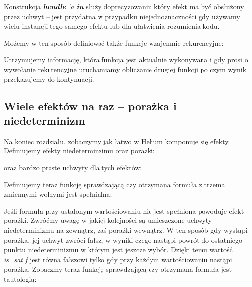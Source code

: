 Konstrukcja \textit{\textbf{handle} `a \textbf{in}} służy doprecyzowaniu który efekt ma być obsłużony przez uchwyt -- jest przydatna w przypadku niejednoznaczności gdy używamy wielu instancji tego samego efektu lub dla ułatwienia rozumienia kodu.

Możemy w ten sposób definiować także funkcje wzajemnie rekurencyjne:



Utrzymujemy informację, która funkcja jest aktualnie wykonywana i gdy prosi o wywołanie rekurencyjne uruchamiamy obliczanie drugiej funkcji po czym wynik przekazujemy do kontynuacji.

% 
% 

\subsection{Wiele efektów na raz -- porażka i niedeterminizm}

Na koniec rozdziału, zobaczymy jak łatwo w Helium komponuje się efekty. Definiujemy efekty niedeterminzimu oraz porażki:



oraz bardzo proste uchwyty dla tych efektów:



Definiujemy teraz funkcję sprawdzającą czy otrzymana formuła z trzema zmiennymi wolnymi jest spełnialna:



Jeśli formuła przy ustalonym wartościowaniu nie jest spełniona powoduje efekt porażki. Zwróćmy uwagę w jakiej kolejności są umieszczone uchwyty -- niedeterminizmu na zewnątrz, zaś porażki wewnątrz. W ten sposób gdy wystąpi porażka, jej uchwyt zwróci fałsz, w wyniki czego nastąpi powrót do ostatniego punktu niedeterminizmu w którym jest jeszcze wybór. Dzięki temu wartość \textit{is\_sat f} jest równa fałszowi tylko gdy przy każdym wartościowaniu nastąpi porażka. Zobaczmy teraz funkcję sprawdzającą czy otrzymana formuła jest tautologią:



